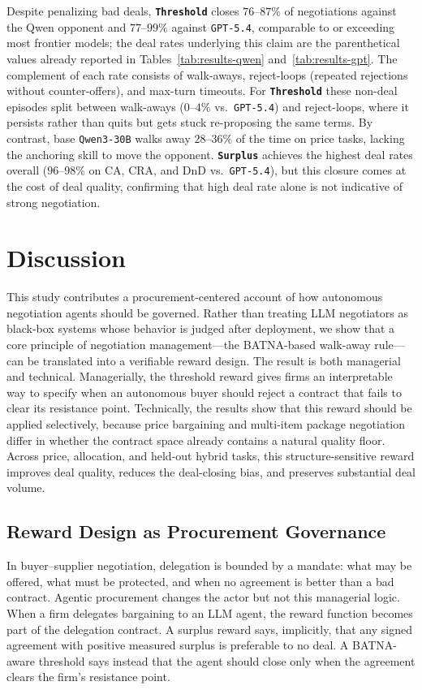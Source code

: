 \documentclass{interact}
\theoremstyle{plain}
\theoremstyle{definition}
\theoremstyle{remark}
\newcommand{\model}[1]{\texttt{#1}}
\newcommand{\Threshold}{\textbf{\texttt{Threshold}}\xspace}
\newcommand{\Surplus}{\textbf{\texttt{Surplus}}\xspace}
\begin{document}
Despite penalizing bad deals, \Threshold closes $76$--$87\%$ of negotiations against the Qwen opponent and $77$--$99\%$ against \model{GPT-5.4}, comparable to or exceeding most frontier models; the deal rates underlying this claim are the parenthetical values already reported in Tables~\ref{tab:results-qwen} and~\ref{tab:results-gpt}. The complement of each rate consists of walk-aways, reject-loops (repeated rejections without counter-offers), and max-turn timeouts. For \Threshold these non-deal episodes split between walk-aways ($0$--$4\%$ vs.\ \model{GPT-5.4}) and reject-loops, where it persists rather than quits but gets stuck re-proposing the same terms. By contrast, base \model{Qwen3-30B} walks away $28$--$36\%$ of the time on price tasks, lacking the anchoring skill to move the opponent. \Surplus achieves the highest deal rates overall ($96$--$98\%$ on CA, CRA, and DnD vs.\ \model{GPT-5.4}), but this closure comes at the cost of deal quality, confirming that high deal rate alone is not indicative of strong negotiation.


\section{Discussion}\label{sec:discussion}

This study contributes a procurement-centered account of how autonomous negotiation agents should be governed. Rather than treating LLM negotiators as black-box systems whose behavior is judged after deployment, we show that a core principle of negotiation management---the BATNA-based walk-away rule---can be translated into a verifiable reward design. The result is both managerial and technical. Managerially, the threshold reward gives firms an interpretable way to specify when an autonomous buyer should reject a contract that fails to clear its resistance point. Technically, the results show that this reward should be applied selectively, because price bargaining and multi-item package negotiation differ in whether the contract space already contains a natural quality floor. Across price, allocation, and held-out hybrid tasks, this structure-sensitive reward improves deal quality, reduces the deal-closing bias, and preserves substantial deal volume.

\subsection{Reward Design as Procurement Governance}

In buyer--supplier negotiation, delegation is bounded by a mandate: what may be offered, what must be protected, and when no agreement is better than a bad contract. Agentic procurement changes the actor but not this managerial logic. When a firm delegates bargaining to an LLM agent, the reward function becomes part of the delegation contract. A surplus reward says, implicitly, that any signed agreement with positive measured surplus is preferable to no deal. A BATNA-aware threshold says instead that the agent should close only when the agreement clears the firm's resistance point.
\end{document}
